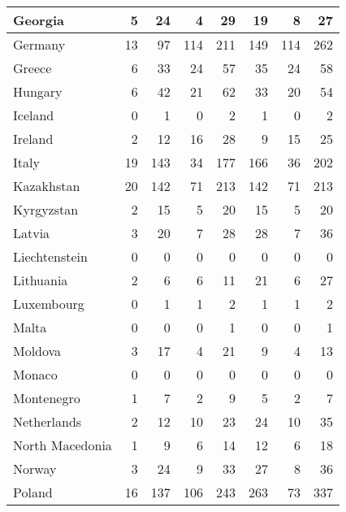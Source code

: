 \begin{table}
\begin{center}
\begin{tabular}{|l|r|r|r|r||r|r|r|}
                       Georgia&     5&    24&     4&    29&    19&     8&    27 \\\hline
                       Germany&    13&    97&   114&   211&   149&   114&   262 \\\hline
                        Greece&     6&    33&    24&    57&    35&    24&    58 \\\hline
                       Hungary&     6&    42&    21&    62&    33&    20&    54 \\\hline
                       Iceland&     0&     1&     0&     2&     1&     0&     2 \\\hline
                       Ireland&     2&    12&    16&    28&     9&    15&    25 \\\hline
                         Italy&    19&   143&    34&   177&   166&    36&   202 \\\hline
                    Kazakhstan&    20&   142&    71&   213&   142&    71&   213 \\\hline
                    Kyrgyzstan&     2&    15&     5&    20&    15&     5&    20 \\\hline
                        Latvia&     3&    20&     7&    28&    28&     7&    36 \\\hline
                 Liechtenstein&     0&     0&     0&     0&     0&     0&     0 \\\hline
                     Lithuania&     2&     6&     6&    11&    21&     6&    27 \\\hline
                    Luxembourg&     0&     1&     1&     2&     1&     1&     2 \\\hline
                         Malta&     0&     0&     0&     1&     0&     0&     1 \\\hline
                       Moldova&     3&    17&     4&    21&     9&     4&    13 \\\hline
                        Monaco&     0&     0&     0&     0&     0&     0&     0 \\\hline
                    Montenegro&     1&     7&     2&     9&     5&     2&     7 \\\hline
                   Netherlands&     2&    12&    10&    23&    24&    10&    35 \\\hline
               North Macedonia&     1&     9&     6&    14&    12&     6&    18 \\\hline
                        Norway&     3&    24&     9&    33&    27&     8&    36 \\\hline
                        Poland&    16&   137&   106&   243&   263&    73&   337 \\\hline

\end{tabular}
\end{center}
\end{table}
